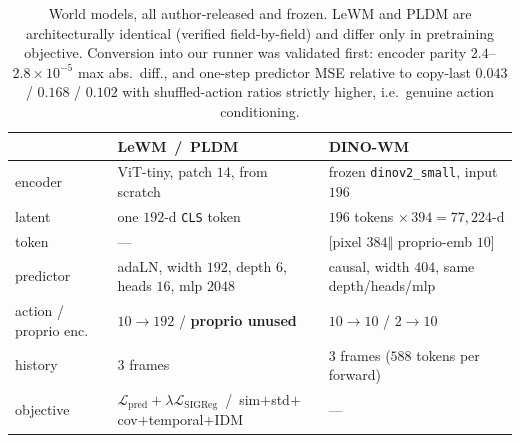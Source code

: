 \begin{table}[h]
\centering\small
\caption{World models, all author-released and frozen. LeWM and PLDM are
architecturally identical (verified field-by-field) and differ only in
pretraining objective. Conversion into our runner was validated first:
encoder parity $2.4$--$2.8\times10^{-5}$ max abs.\ diff., and one-step
predictor MSE relative to copy-last $0.043$ / $0.168$ / $0.102$ with
shuffled-action ratios strictly higher, i.e.\ genuine action conditioning.}
\begin{tabular}{lll}
\toprule
 & LeWM \,/\, PLDM & DINO-WM \\
\midrule
encoder & ViT-tiny, patch $14$, from scratch & frozen \texttt{dinov2\_small}, input $196$ \\
latent & one $192$-d \texttt{CLS} token & $196$ tokens $\times\,394 = 77{,}224$-d \\
token & --- & [pixel $384 \Vert$ proprio-emb $10$] \\
predictor & adaLN, width $192$, depth $6$, heads $16$, mlp $2048$ & causal, width $404$, same depth/heads/mlp \\
action / proprio enc. & $10\!\to\!192$ / \textbf{proprio unused} & $10\!\to\!10$ / $2\!\to\!10$ \\
history & $3$ frames & $3$ frames ($588$ tokens per forward) \\
objective & $\mathcal L_{\text{pred}}\!+\!\lambda\mathcal L_{\text{SIGReg}}$ \,/\, sim$+$std$+$cov$+$temporal$+$IDM & --- \\
\bottomrule
\end{tabular}
\end{table}

